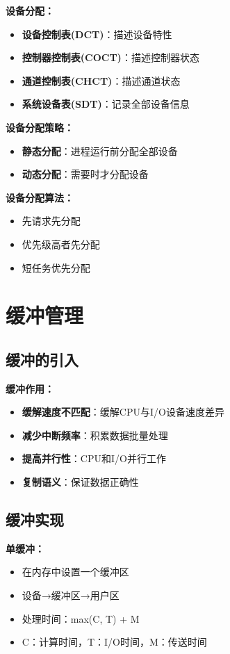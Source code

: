 \documentclass[lang=cn,newtx,10pt,scheme=chinese]{../../elegantbook}
\begin{document}
\textbf{设备分配：}
\begin{itemize}
  \item \textbf{设备控制表(DCT)}：描述设备特性
  \item \textbf{控制器控制表(COCT)}：描述控制器状态
  \item \textbf{通道控制表(CHCT)}：描述通道状态
  \item \textbf{系统设备表(SDT)}：记录全部设备信息
\end{itemize}

\textbf{设备分配策略：}
\begin{itemize}
  \item \textbf{静态分配}：进程运行前分配全部设备
  \item \textbf{动态分配}：需要时才分配设备
\end{itemize}

\textbf{设备分配算法：}
\begin{itemize}
  \item 先请求先分配
  \item 优先级高者先分配
  \item 短任务优先分配
\end{itemize}

\section{缓冲管理}

\subsection{缓冲的引入}

\textbf{缓冲作用：}
\begin{itemize}
  \item \textbf{缓解速度不匹配}：缓解CPU与I/O设备速度差异
  \item \textbf{减少中断频率}：积累数据批量处理
  \item \textbf{提高并行性}：CPU和I/O并行工作
  \item \textbf{复制语义}：保证数据正确性
\end{itemize}

\subsection{缓冲实现}

\textbf{单缓冲：}
\begin{itemize}
  \item 在内存中设置一个缓冲区
  \item 设备→缓冲区→用户区
  \item 处理时间：max(C, T) + M
  \item C：计算时间，T：I/O时间，M：传送时间
\end{itemize}
\end{document}
